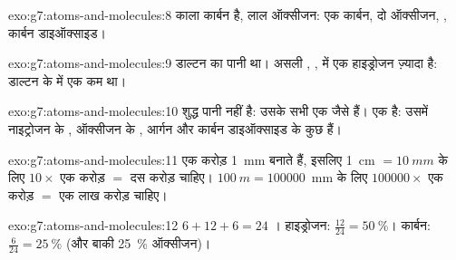 \begin{solution}{exo:g7:atoms-and-molecules:8}
काला कार्बन है, लाल ऑक्सीजन: एक कार्बन, दो ऑक्सीजन, ,
कार्बन डाइऑक्साइड।
\end{solution}

\begin{solution}{exo:g7:atoms-and-molecules:9}
डाल्टन का पानी  था। असली , , में एक हाइड्रोजन
 ज़्यादा है: डाल्टन के  में एक  कम था।
\end{solution}

\begin{solution}{exo:g7:atoms-and-molecules:10}
शुद्ध पानी  नहीं है: उसके सभी  एक जैसे 
 हैं।  एक  है: उसमें नाइट्रोजन के , ऑक्सीजन के
, आर्गन  और कार्बन डाइऑक्साइड के कुछ  हैं।
\end{solution}

\begin{solution}{exo:g7:atoms-and-molecules:11}
एक करोड़  \qty{1}{mm} बनाते हैं, इसलिए \qty{1}{cm} $= \qty{10}{mm}$
के लिए $10 \times$ एक करोड़ $=$ दस करोड़  चाहिए।
$\qty{100}{m} = \num{100000}$~mm के लिए $\num{100000}\times$ एक करोड़
$=$ एक लाख करोड़  चाहिए।
\end{solution}

\begin{solution}{exo:g7:atoms-and-molecules:12}
$6 + 12 + 6 = 24$ । हाइड्रोजन: $\frac{12}{24} = \qty{50}{\percent}$।
कार्बन: $\frac{6}{24} = \qty{25}{\percent}$ (और बाकी
\qty{25}{\percent} ऑक्सीजन)।
\end{solution}

